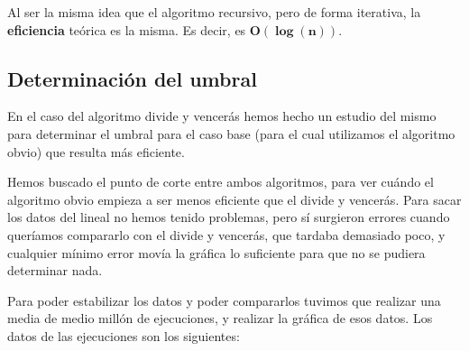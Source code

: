 Al ser la misma idea que el algoritmo recursivo, pero de forma iterativa, la \textbf{eficiencia} teórica es la misma. Es decir, es  $\mathbf{O(\log(n))}$.

\subsection{Determinación del umbral}

En el caso del algoritmo divide y vencerás hemos hecho un estudio del mismo para determinar el umbral para el caso base (para el cual utilizamos el algoritmo obvio) que resulta más eficiente.


Hemos buscado el punto de corte entre ambos algoritmos, para ver cuándo el algoritmo obvio empieza a ser menos eficiente que el divide y vencerás. Para sacar los datos del lineal no hemos tenido problemas, pero sí surgieron errores cuando queríamos compararlo con el divide y vencerás, que tardaba demasiado poco, y cualquier mínimo error movía la gráfica lo suficiente para que no se pudiera determinar nada.

Para poder estabilizar los datos y poder compararlos tuvimos que realizar una media de medio millón de ejecuciones, y realizar la gráfica de esos datos. Los datos de las ejecuciones son los siguientes:

\vspace*{1cm}

\posObvioComp
{}\posDyVComp
{} {\posObvioComp}

\pgfplotstabletypeset[
display columns/0/.style={column name=Tamaño},
display columns/1/.style={column name=Algoritmo Obvio},
display columns/2/.style={column name=Algoritmo DyV (rec)},
skip rows between index={25}{50}
]{\posObvioComp}

\vspace*{1cm}

